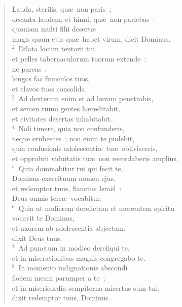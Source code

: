 \begin{flushleft}\begin{verse}\vspace{-19pt}\hspace{6pt}Lauda, sterilis, qu\ae\ non paris~;\\\hspace{6pt} decanta laudem, et hinni, qu\ae\ non pariebas~:\\ quoniam multi filii desert\ae \\ magis quam ejus qu\ae\ habet virum, dicit Dominus.\\
${}^{2}$~Dilata locum tentorii tui,\\ et pelles tabernaculorum tuorum extende~:\\ ne parcas~:\\ longos fac funiculos tuos,\\ et clavos tuos consolida.\\
${}^{3}$~Ad dexteram enim et ad l\ae vam penetrabis,\\ et semen tuum gentes h\ae reditabit,\\ et civitates desertas inhabitabit.\\
${}^{4}$~Noli timere, quia non confunderis,\\ neque erubesces~; non enim te pudebit,\\ quia confusionis adolescenti\ae\ tu\ae\ oblivisceris,\\ et opprobrii viduitatis tu\ae\ non recordaberis amplius.\\
${}^{5}$~Quia dominabitur tui qui fecit te,\\ Dominus exercituum nomen ejus,\\ et redemptor tuus, Sanctus Isra\"el~:\\ Deus omnis terr\ae\ vocabitur.\\
${}^{6}$~Quia ut mulierem derelictam et mœrentem spiritu\\ vocavit te Dominus,\\ et uxorem ab adolescentia abjectam,\\ dixit Deus tuus.\\
${}^{7}$~Ad punctum in modico dereliqui te,\\ et in miserationibus magnis congregabo te.\\
${}^{8}$~In momento indignationis abscondi\\ faciem meam parumper a te~;\\ et in misericordia sempiterna misertus sum tui,\\ dixit redemptor tuus, Dominus.\\

\end{verse}
\end{flushleft}

